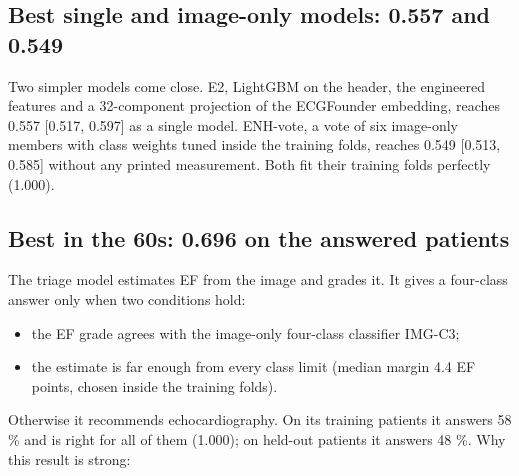 \subsection{Best single and image-only models: 0.557 and 0.549}\label{sec:6.1.2}

Two simpler models come close. E2, LightGBM on the header, the engineered features and a 32-component projection of the ECGFounder embedding, reaches 0.557 [0.517, 0.597] as a single model. ENH-vote, a vote of six image-only members with class weights tuned inside the training folds, reaches 0.549 [0.513, 0.585] without any printed measurement. Both fit their training folds perfectly (1.000).

\subsection{Best in the 60s: 0.696 on the answered patients}\label{sec:6.1.3}

The triage model estimates EF from the image and grades it. It gives a four-class answer only when two conditions hold:

\begin{itemize}
  \item the EF grade agrees with the image-only four-class classifier IMG-C3;
  \item the estimate is far enough from every class limit (median margin 4.4 EF points, chosen inside the training folds).
\end{itemize}
Otherwise it recommends echocardiography. On its training patients it answers 58 \% and is right for all of them (1.000); on held-out patients it answers 48 \%. Why this result is strong:

